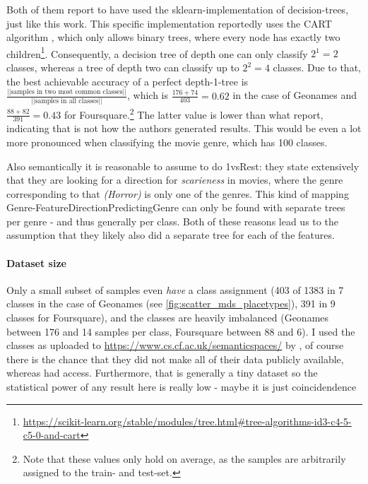Both of them report to have used the sklearn-implementation of decision-trees, just like this work. This specific implementation reportedly uses the CART algorithm \cite{breiman1984classification}, which only allows binary trees, where every node has exactly two children\footnote{\url{https://scikit-learn.org/stable/modules/tree.html\#tree-algorithms-id3-c4-5-c5-0-and-cart}}. Consequently, a decision tree of depth one can only classify $2^1 = 2$ classes, whereas a tree of depth two can classify up to $2^2=4$ classes. 
Due to that, the best achievable accuracy of a perfect depth-1-tree is $\frac{\text{||samples in two most common classes||}}{\text{||samples in all classes||}}$, which is $\frac{176+74}{403} = 0.62$ in the case of Geonames and $\frac{88+82}{391} = 0.43$ for Foursquare.\footnote{Note that these values only hold on average, as the samples are arbitrarily assigned to the train- and test-set.} The latter value is lower than what \cite{Alshaikh2020} report, indicating that is not how the authors generated results. This would be even a lot more pronounced when classifying the movie genre, which has 100 classes. 

Also semantically it is reasonable to assume to do 1vsRest: they state extensively that they are looking for a direction for \textit{scarieness} in movies, where the genre corresponding to that \textit{(Horror)} is only one of the genres. This kind of mapping Genre-FeatureDirectionPredictingGenre can only be found with separate trees per genre - and thus generally per class. Both of these reasons lead us to the assumption that they likely also did a separate tree for each of the features.

\paragraph{Dataset size}
Only a small subset of samples even \textit{have} a class assignment (403 of 1383 in 7 classes in the case of Geonames (see \autoref{fig:scatter_mds_placetypes}), 391 in 9 classes for Foursquare), and the classes are heavily imbalanced (Geonames between 176 and 14 samples per class, Foursquare between 88 and 6). I used the classes as uploaded to \url{https://www.cs.cf.ac.uk/semanticspaces/} by \cite{Derrac2015}, of course there is the chance that they did not make all of their data publicly available, whereas \cite{Ager2018, Alshaikh2020} had access. Furthermore, that is generally a tiny dataset so the statistical power of any result here is really low - maybe it is just coincidendence

